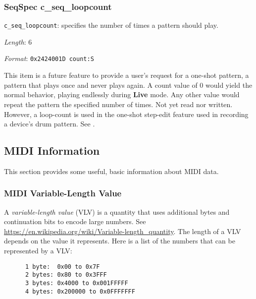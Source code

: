 \subsubsection{SeqSpec c\_seq\_loopcount}
\label{subsubsec:midi_format_track_seqspec_seq_loopcount}

   \begin{description}
      \item \texttt{c\_seq\_loopcount}:
         specifies the number of times a pattern should play.
      \item \textsl{Length}: 6
      \item \textsl{Format}: \texttt{0x2424001D count:S}
   \end{description}

   This item is a future feature to provide a user's request for a one-shot
   pattern, a pattern that plays once and never plays again.  A count value of
   0 would yield
   the normal behavior, playing endlessly during \textbf{Live} mode.
   Any other value would repeat the pattern the specified number of times.
   Not yet read nor written.  
   However, a loop-count is used in the one-shot step-edit feature used in
   recording a device's drum pattern.
   See .

\subsection{MIDI Information}
\label{subsec:midi_information}

   This section provides some useful, basic information about MIDI data.

\subsubsection{MIDI Variable-Length Value}
\label{subsubsec:midi_variable_length_value}

   A \textsl{variable-length value} (VLV) is a quantity that uses additional
   bytes and continuation bits to encode large numbers.
   See \url{https://en.wikipedia.org/wiki/Variable-length\_quantity}.
   The length of a VLV depends on the value it represents.
   Here is a list of the numbers that can be represented by a VLV:

   \begin{verbatim}
      1 byte:  0x00 to 0x7F
      2 bytes: 0x80 to 0x3FFF
      3 bytes: 0x4000 to 0x001FFFFF
      4 bytes: 0x200000 to 0x0FFFFFFF
   \end{verbatim}

